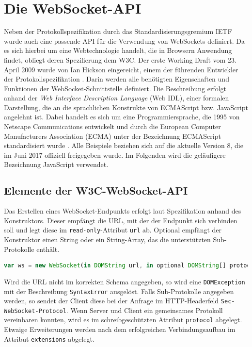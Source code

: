 \documentclass[11pt,a4paper,titlepage]{scrartcl}
\numberwithin{equation}{section}
\begin{document}
\section{Die WebSocket-API}\label{sec:WebSocketAPI}
Neben der Protokollspezifikation durch das Standardisierungsgremium IETF wurde auch eine passende API für die Verwendung von WebSockets definiert. Da es sich hierbei um eine Webtechnologie handelt, die in Browsern Anwendung findet, obliegt deren Spezifierung dem W3C. Der erste Working Draft vom 23. April 2009 wurde von Ian Hickson eingereicht, einem der führenden Entwickler der Protokollspezifikation \autocite{hickson_web_2009}. Darin werden alle benötigten Eigenschaften und Funktionen der WebSocket-Schnittstelle definiert. Die Beschreibung erfolgt anhand der \textit{Web Interface Description Language} (Web IDL), einer formalen Darstellung, die an die sprachlichen Konstrukte von ECMAScript bzw. JavaScript angelehnt ist. Dabei handelt es sich um eine Programmiersprache, die 1995 von Netscape Communications entwickelt und durch die European Computer Manufacturers Association (ECMA) unter der Bezeichnung ECMAScript standardisiert wurde \autocite{peyrott_brief_2017}. Alle Beispiele beziehen sich auf die aktuelle Version 8, die im Juni 2017 offiziell freigegeben wurde. Im Folgenden wird die geläufigere Bezeichnung JavaScript verwendet.

\subsection{Elemente der W3C-WebSocket-API}
Das Erstellen eines WebSocket-Endpunkts erfolgt laut Spezifikation anhand des Konstruktors. Dieser empfängt die URL, mit der der Endpunkt sich verbinden soll und legt diese im \texttt{read-only}-Attribut \texttt{url} ab. Optional empfängt der Konstruktor einen String oder ein String-Array, das die unterstützten Sub-Protokolle enthält. \bigskip

\begin{lstlisting}[frame=single, language=JavaScript, caption=WebSocket anlegen und verbinden]
	var ws = new WebSocket(in DOMString url, in optional DOMString[] protocols);
\end{lstlisting}

\noindent Wird die URL nicht im korrekten Schema angegeben, so wird eine \texttt{DOMException} mit der Beschreibung \texttt{SyntaxError} ausgelöst. Falls Sub-Protokolle angegeben werden, so sendet der Client diese bei der Anfrage im HTTP-Headerfeld \texttt{Sec-WebSocket-Protocol}. Wenn Server und Client ein gemeinsames Protokoll vereinbaren konnten, wird es im schreibgeschützten Attribut \texttt{protocol} abgelegt. Etwaige Erweiterungen werden nach dem erfolgreichen Verbindungsaufbau im Attribut \texttt{extensions} abgelegt.
\end{document}
